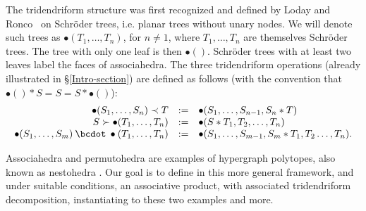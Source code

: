 The tridendriform structure was first recognized and defined by Loday and Ronco~\cite{LR} on Schr\"oder trees, i.e. planar trees without  unary nodes. We will denote such trees as $\bullet(T_1,\ldots,T_n)$, for $n\neq 1$, where $T_1, \ldots, T_n$ are themselves Schr\"oder trees. The tree with only one leaf is then $\bullet()$.
Schr\"oder trees with at least two leaves label the faces of associahedra.
The three tridendriform operations  (already illustrated in \S\ref{Intro-section}) are defined as follows (with the convention that $\bullet() \ast S=S=S\ast\bullet()$):
$$\begin{array}{rcl}
\bullet(S_1,\ldots,S_n)\prec T & :=& \bullet (S_1,\ldots,S_{n-1},S_n\ast T)\\
S\succ \bullet (T_1,\ldots,T_n) & := & \bullet(S\ast T_1,T_2,\ldots,T_n) \\
\bullet(S_1,\ldots,S_m) \:\bcdot\: \bullet(T_1,\ldots,T_n) & := & \bullet(S_1,\ldots,S_{m-1}, S_m\ast T_1,T_2\ldots,T_n) .
\end{array}$$

Associahedra and permutohedra are examples of hypergraph polytopes, also known as nestohedra \cite{P09,FS05}. Our goal is to define in this more general framework, and under suitable conditions, an associative product, with associated tridendriform decomposition, instantiating to these two examples and  more.

